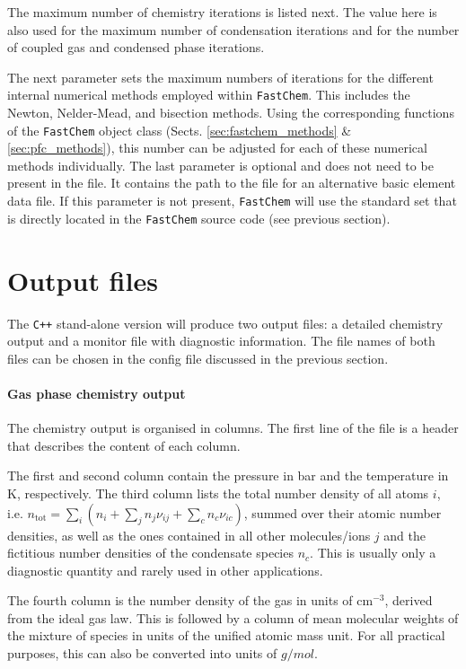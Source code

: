 \documentclass[numbers=noenddot]{aux/fcmanual}
\newcommand{\fc}{\texttt{FastChem}\xspace}
\newcommand{\cpp}{\ttt{C++}\xspace}
\newcommand{\ttt}[1]{\texttt {#1}}
\begin{document}
The maximum number of chemistry iterations is listed next. The value here is also used for the maximum number of condensation iterations and for the number of coupled gas and condensed phase iterations.

The next parameter sets the maximum numbers of iterations for the different internal numerical methods employed within \fc. This includes the Newton, Nelder-Mead, and bisection methods. Using the corresponding functions of the \fc object class (Sects. \ref{sec:fastchem_methods} \& \ref{sec:pfc_methods}), this number can be adjusted for each of these numerical methods individually. 
The last parameter is optional and does not need to be present in the file. It contains the path to the file for an alternative basic element data file. If this parameter is not present, \fc will use the standard set that is directly located in the \fc source code (see previous section).


\section{Output files}
\label{sec:fc_cpp_output}

The \cpp stand-alone version will produce two output files: a detailed chemistry output and a monitor file with diagnostic information. The file names of both files can be chosen in the config file discussed in the previous section.

\paragraph{Gas phase chemistry output} 
The chemistry output is organised in columns. The first line of the file is a header that describes the content of each column.

The first and second column contain the pressure in bar and the temperature in K, respectively. The third column lists the total number density of all atoms $i$, i.e. $n_\mathrm{tot} = \sum_i \left( n_i + \sum_j n_j \nu_{ij} + \sum_c n_c \nu_{ic} \right)$, summed over their atomic number densities, as well as the ones contained in all other molecules/ions $j$ and the fictitious number densities of the condensate species $n_c$. This is usually only a diagnostic quantity and rarely used in other applications. 

The fourth column is the number density of the gas in units of cm$^{-3}$, derived from the ideal gas law. This is followed by a column of mean molecular weights of the mixture of species in units of the unified atomic mass unit. For all practical purposes, this can also be converted into units of $\unit{g/mol}$.
\end{document}
